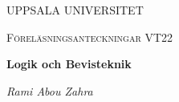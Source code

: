 \begin{titlepage}

  \centering
	{\scshape\LARGE UPPSALA UNIVERSITET\par}
	\vspace{1cm}
  {\scshape\Large {Föreläsningsanteckningar VT22} \par}
	\vspace{1.5cm}
  {\huge\bfseries {Logik och Bevisteknik} \par}
	\vspace{2cm}
	{\Large\itshape Rami Abou Zahra \par}
	\vfill
  \vfill


\end{titlepage}
